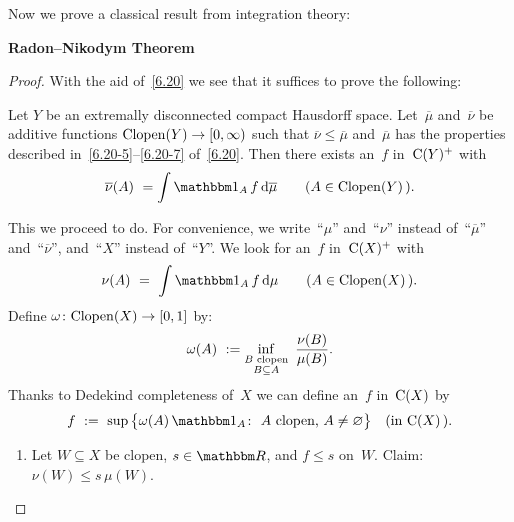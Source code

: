 \documentclass[main.tex]{subfiles}
\begin{document}
\begin{psec}{6.21}%
\noindent Now we prove a classical result from integration theory:

\vspace{.5em}
\noindent\textbf{Radon--Nikodym Theorem}\  
\end{psec}
\begin{proof}
With the aid of~\ref{6.20}
we see that it suffices to prove the following:
\vspace{.5em}
\begin{center}
\begin{minipage}{.8\textwidth}
Let $Y$ be an extremally disconnected compact Hausdorff space.
Let~$\overline\mu$ and~$\overline\nu$
be additive functions $\mathrm{Clopen}(Y)\rightarrow[0,\infty)$
such that $\overline\nu\leq\overline\mu$
and~$\overline\mu$ has the properties described
in~\ref{6.20-5}--\ref{6.20-7} of~\ref{6.20}.
Then there exists an~$f$ in~$\mathrm{C}(Y)^+$ with
\begin{equation*}
\overline\nu(A)\ =\int\mathbb{1}_A\,f\,\mathrm{d}\overline\mu
   \qquad (A\in\clopen(Y)\,)\htam{.}
\end{equation*}
\end{minipage}
\end{center}
\vspace{.5em}
This we proceed to do.
For convenience,
we write~``$\mu$'' and~``$\nu$''
instead of~``$\overline\mu$'' and~``$\overline\nu$'',
and~``$X$'' instead of~``$Y$''.
We look for an~$f$ in~$\mathrm{C}(X)^+$ with
\begin{equation*}
\nu(A)\ =\ \int\mathbb{1}_A\,f\,\mathrm{d}\mu
  \qquad (A\in\clopen(X)\,)\htam{.}
\end{equation*}
Define $\omega\colon\mathrm{Clopen}(X)\rightarrow[0,1]$ by:
\begin{equation*}
\omega(A)\ :=\inf_{\substack{B\text{ clopen}\\B\subseteq A}}\  
\frac{\nu(B)}{\mu(B)}\text{.}
\end{equation*}
Thanks to Dedekind completeness of~$X$
we can define an~$f$ in~$\mathrm{C}(X)$ by
\begin{equation*}
f\ :=\ \sup\,\bigl\{ \omega(A)\,\mathbb{1}_A\colon\ 
   A\htam{ clopen,} \ A\neq\varnothing\bigr\}
\quad\htam{(in }\Cont{X}\,\htam{).}
\end{equation*}
\begin{enumerate}[label=(\Roman*)]
\item\label{6.21-I}
Let $W\subseteq X$ be clopen,
$s\in\R$, and $f\leq s$ on~$W$.
Claim: $\nu(W)\leq s\,\mu(W)$.


\end{enumerate}
\end{proof}
\end{document}
